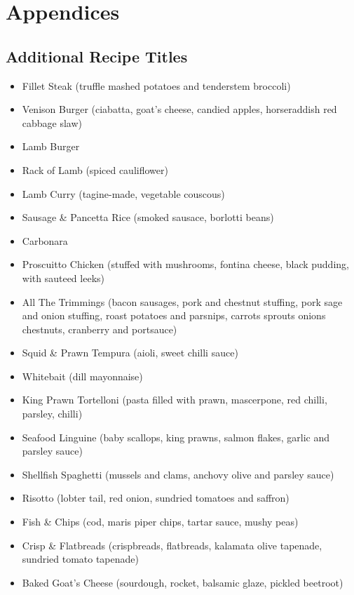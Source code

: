 \documentclass[11pt, english]{article}
\begin{document}
\newpage

\section{Appendices}

	\subsection{Additional Recipe Titles}
	
	\begin{itemize}
        \setlength\itemsep{0cm}
                \item Fillet Steak (truffle mashed potatoes and tenderstem broccoli)
		\item Venison Burger (ciabatta, goat's cheese, candied apples, horseraddish red cabbage slaw)
		\item Lamb Burger
		\item Rack of Lamb (spiced cauliflower)
		\item Lamb Curry (tagine-made, vegetable couscous)
		\item Sausage \& Pancetta Rice (smoked sausace, borlotti beans)
		\item Carbonara
		\item Proscuitto Chicken (stuffed with mushrooms, fontina cheese, black pudding, with sauteed leeks)
		\item All The Trimmings (bacon sausages, pork and chestnut stuffing, pork sage and onion stuffing, roast potatoes and parsnips, carrots sprouts onions chestnuts, cranberry and portsauce)
		\item Squid \& Prawn Tempura (aioli, sweet chilli sauce)
		\item Whitebait (dill mayonnaise)
		\item King Prawn Tortelloni (pasta filled with prawn, mascerpone, red chilli, parsley, chilli)
		\item Seafood Linguine (baby scallops, king prawns, salmon flakes, garlic and parsley sauce)
		\item Shellfish Spaghetti (mussels and clams, anchovy olive and parsley sauce)
		\item Risotto (lobter tail, red onion, sundried tomatoes and saffron)
		\item Fish \& Chips (cod, maris piper chips, tartar sauce, mushy peas)
		\item Crisp \& Flatbreads (crispbreads, flatbreads, kalamata olive tapenade, sundried tomato tapenade)
		\item Baked Goat's Cheese (sourdough, rocket, balsamic glaze, pickled beetroot)

\end{itemize}
\end{document}
